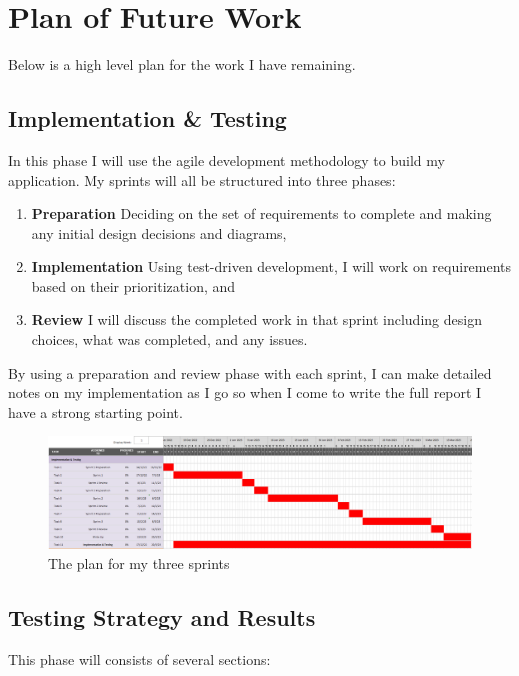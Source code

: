 \section{Plan of Future Work}

Below is a high level plan for the work I have remaining. 

\subsection*{Implementation \& Testing}
In this phase I will use the agile development methodology to build my application. My sprints will all be structured into three phases:
\vspace{1mm}

\begin{enumerate}
  \item \textbf{Preparation} Deciding on the set of requirements to complete and making any initial design decisions and diagrams,
  \item \textbf{Implementation} Using test-driven development, I will work on requirements based on their prioritization, and
  \item \textbf{Review} I will discuss the completed work in that sprint including design choices, what was completed, and any issues.  
\end{enumerate}

\vspace{1mm}\noindent By using a preparation and review phase with each sprint, I can make detailed notes on my implementation as I go so when I come to write the full report I have a strong starting point.

\begin{figure}[H]
  \centering
  \includegraphics[width=\textwidth]{assets/images/charts/gantt/implementation-testing.png}
  \caption{The plan for my three sprints}
\end{figure}

\subsection*{Testing Strategy and Results}
This phase will consists of several sections:


